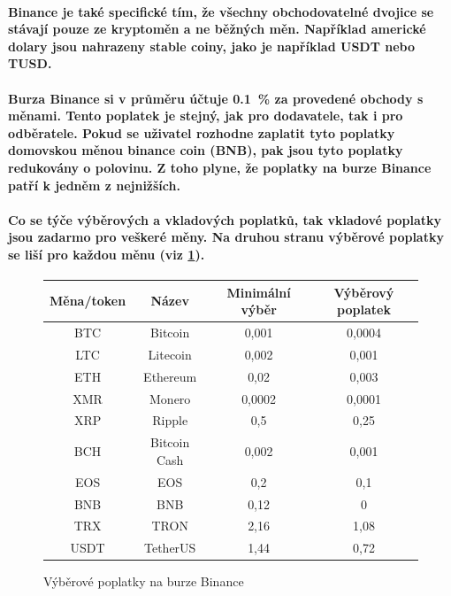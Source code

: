 \documentclass[thesis=B,czech]{FITthesis}[2019/03/21]
\begin{document}
\paragraph{
Binance je také specifické tím, že všechny obchodovatelné dvojice se stávají pouze ze kryptoměn a ne běžných měn. Například americké dolary jsou nahrazeny stable coiny, jako je například USDT nebo TUSD. 
}
\paragraph{
Burza Binance si v průměru účtuje 0.1~\% za provedené obchody s měnami. Tento poplatek je stejný, jak pro dodavatele, tak i pro odběratele. Pokud se uživatel rozhodne zaplatit tyto poplatky domovskou měnou binance coin (BNB), pak jsou tyto poplatky redukovány o polovinu. Z toho plyne, že poplatky na burze Binance patří k jedněm z nejnižších.
}
\paragraph{
Co se týče výběrových a vkladových poplatků, tak vkladové poplatky jsou zadarmo pro veškeré měny. Na druhou stranu výběrové poplatky se liší pro každou měnu (viz \ref{binance_fees}). \cite{blockonomi_binance}
}
\begin{figure}\centering
    \begin{center}
     \begin{tabular}{||c | c | c | c||} 
     \hline
     Měna/token & Název & Minimální výběr & Výběrový poplatek \\ [0.5ex] 
     \hline\hline
     BTC & Bitcoin & 0,001 & 0,0004 \\ 
     \hline
     LTC & Litecoin & 0,002 & 0,001 \\
     \hline
     ETH & Ethereum & 0,02 & 0,003 \\
     \hline
     XMR & Monero & 0,0002 & 0,0001 \\
     \hline
     XRP & Ripple & 0,5 & 0,25 \\
     \hline
     BCH & Bitcoin Cash & 0,002 & 0,001 \\
     \hline
     EOS & EOS & 0,2 & 0,1 \\
     \hline
     BNB & BNB & 0,12 & 0 \\
     \hline
     TRX & TRON & 2,16 & 1,08 \\
     \hline
     USDT & TetherUS & 1,44 & 0,72 \\ [1ex] 
     \hline
    \end{tabular}
    \end{center}
    \caption{Výběrové poplatky na burze Binance \cite{binance_fees}}
    \label{binance_fees}
\end{figure}
\end{document}
